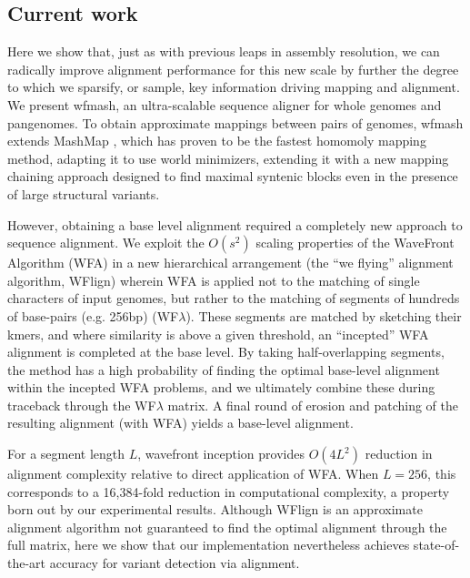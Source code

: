 \documentclass{bioinfo}
\theoremstyle{definition}
\begin{document}

\subsection{Current work}

Here we show that, just as with previous leaps in assembly resolution, we can radically improve alignment performance for this new scale by further the degree to which we sparsify, or sample, key information driving mapping and alignment.
We present wfmash, an ultra-scalable sequence aligner for whole genomes and pangenomes.
To obtain approximate mappings between pairs of genomes, wfmash extends MashMap \citep{Jain_2018}, which has proven to be the fastest homomoly mapping method, adapting it to use world minimizers, extending it with a new mapping chaining approach designed to find maximal syntenic blocks even in the presence of large structural variants.

However, obtaining a base level alignment required a completely new approach to sequence alignment.
We exploit the $O(s^2)$ scaling properties of the WaveFront Algorithm (WFA) \citep{Marco_Sola_2020} in a new hierarchical arrangement (the ``we flying'' alignment algorithm, WFlign) wherein WFA is applied not to the matching of single characters of input genomes, but rather to the matching of segments of hundreds of base-pairs (e.g. 256bp) (WF$\lambda$).
These segments are matched by sketching their kmers, and where similarity is above a given threshold, an ``incepted'' WFA alignment is completed at the base level.
By taking half-overlapping segments, the method has a high probability of finding the optimal base-level alignment within the incepted WFA problems, and we ultimately combine these during traceback through the WF$\lambda$ matrix.
A final round of erosion and patching of the resulting alignment (with WFA) yields a base-level alignment.

For a segment length $L$, wavefront inception provides $O(4L^2)$ reduction in alignment complexity relative to direct application of WFA.
When $L=256$, this corresponds to a 16,384-fold reduction in computational complexity, a property born out by our experimental results.
Although WFlign is an approximate alignment algorithm not guaranteed to find the optimal alignment through the full matrix, here we show that our implementation nevertheless achieves state-of-the-art accuracy for variant detection via alignment.
\end{document}
